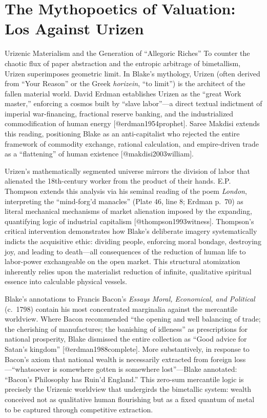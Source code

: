 \documentclass[
  ignorenonframetext,
]{beamer}
\author{\texorpdfstring{}{}}
\date{}
\begin{document}
\section{The Mythopoetics of Valuation: Los Against
Urizen}\label{the-mythopoetics-of-valuation-los-against-urizen}

\begin{frame}{Urizenic Materialism and the Generation of ``Allegoric
Riches''}
\protect{}\label{urizenic-materialism-and-the-generation-of-allegoric-riches}
To counter the chaotic flux of paper abstraction and the entropic
arbitrage of bimetallism, Urizen superimposes geometric limit. In
Blake's mythology, Urizen (often derived from ``Your Reason'' or the
Greek \emph{horizein}, ``to limit'') is the architect of the fallen
material world. David Erdman establishes Urizen as the ``great Work
master,'' enforcing a cosmos built by ``slave labor''---a direct textual
indictment of imperial war-financing, fractional reserve banking, and
the industrialized commodification of human energy
{[}@erdman1954prophet{]}. Saree Makdisi extends this reading,
positioning Blake as an anti-capitalist who rejected the entire
framework of commodity exchange, rational calculation, and empire-driven
trade as a ``flattening'' of human existence {[}@makdisi2003william{]}.

Urizen's mathematically segmented universe mirrors the division of labor
that alienated the 18th-century worker from the product of their hands.
E.P. Thompson extends this analysis via his seminal reading of the poem
\emph{London}, interpreting the ``mind-forg'd manacles'' (Plate 46, line
8; Erdman p.~70) as literal mechanical mechanisms of market alienation
imposed by the expanding, quantifying logic of industrial capitalism
{[}@thompson1993witness{]}. Thompson's critical intervention
demonstrates how Blake's deliberate imagery systematically indicts the
acquisitive ethic: dividing people, enforcing moral bondage, destroying
joy, and leading to death---all consequences of the reduction of human
life to labor-power exchangeable on the open market. This structural
atomization inherently relies upon the materialist reduction of
infinite, qualitative spiritual essence into calculable physical
vessels.

Blake's annotations to Francis Bacon's \emph{Essays Moral, Economical,
and Political} (c.~1798) contain his most concentrated marginalia
against the mercantile worldview. Where Bacon recommended ``the opening
and well balancing of trade; the cherishing of manufactures; the
banishing of idleness'' as prescriptions for national prosperity, Blake
dismissed the entire collection as ``Good advice for Satan's kingdom''
{[}@erdman1988complete{]}. More substantively, in response to Bacon's
axiom that national wealth is necessarily extracted from foreign
loss---``whatsoever is somewhere gotten is somewhere lost''---Blake
annotated: ``Bacon's Philosophy has Ruin'd England.'' This zero-sum
mercantile logic is precisely the Urizenic worldview that undergirds the
bimetallic system: wealth conceived not as qualitative human flourishing
but as a fixed quantum of metal to be captured through competitive
extraction.


\end{frame}
\end{document}
